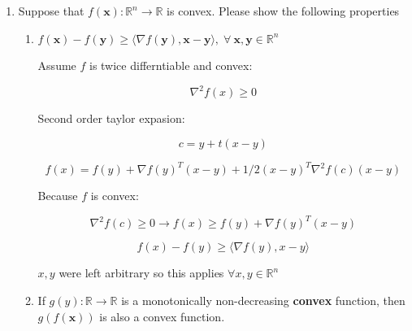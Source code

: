 \documentclass[11pt,letterpaper]{article}
\begin{document}
\begin{enumerate}
	If $f"(x) \geq 0$ then $f'(x) 
	\leq f'(y)$ for $x < y$

	Mean Value theoreom: 
	$ \exists \ c \in (x,y) s.t.$:

	\[ \frac{f(y) - f(x)}{y - x} = f'(c) \]

	As $f'$ is not decreasing:

	\[ f'(x) \leq f'(c) \]

	So the tangent line at every 

	\[ f(y) = f(x) + f'(c)(y-x) 
	\geq f(x) + f'(x)(y - x) \]

	As it holds for 
	$\forall (x,y)$ then $(x,y)$
	can be flipped

	\[ f(x) \geq f(y) + f'(y)(x -y) \]   

	Adding $f(x), f(y)$ inequalities
	together we get:

	\[ 0 \geq f'(x)(y - x) + f'(y)(x - y) \]   

	\[ y - x \geq 0 \]   

	\[ f'(x) \leq f'(y) \]   

	Therefor $f'$ is nondecreasing at all x

	\[ f"(x) \geq 0 \]

	\item Suppose that 
	$f(\mathbf{x}):\mathbb{R}^n\to \mathbb{R}$ 
	is convex. Please show the following properties
	\begin{enumerate}
		\item $f(\mathbf{x})-f(\mathbf{y})\ge \langle \nabla f(\mathbf{y}), \mathbf{x}-\mathbf{y}\rangle, \; \forall~\mathbf{x}, \mathbf{y}\in\mathbb{R}^n$
		
		Assume $f$ is twice differntiable and convex:

		\[ \nabla^2 f(x) \geq 0 \]   

		Second order taylor expasion:

		\[ c = y + t(x-y) \]   

		\[ f(x) = f(y) + \nabla f(y)^T (x-y) + 
		1/2(x-y)^T \nabla^2 f(c)(x-y) \]   

		Because $f$ is convex:

		\[ \nabla^2 f(c) \geq 0 \rightarrow
		f(x) \geq f(y) + \nabla f(y)^T (x-y)\]

		\[ f(x) - f(y) \geq 
		\langle \nabla f(y), x-y \rangle \]   

		$x,y$ were left arbitrary so this applies
		$\forall x,y \in \mathbb{R}^n$
		
		\item If $g(y): \mathbb{R}\to\mathbb{R}$ 
		is a monotonically non-decreasing 
		{\bf convex} function, 
		then $g(f(\mathbf{x}))$ 
		is also a convex function. 


\end{enumerate}
\end{enumerate}
\end{document}
